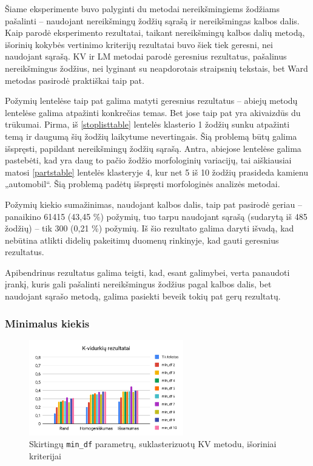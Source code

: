 \documentclass{VUMIFInfBakalaurinis}
\begin{document}
Šiame eksperimente buvo palyginti du metodai nereikšmingiems žodžiams
pašalinti -- naudojant nereikšmingų žodžių sąrašą ir nereikšmingas
kalbos dalis.
Kaip parodė eksperimento rezultatai, taikant nereikšmingų kalbos dalių metodą,
 išorinių kokybės vertinimo kriterijų rezultatai buvo šiek tiek geresni, nei naudojant sąrašą. 
KV ir LM
metodai parodė geresnius rezultatus, pašalinus nereikšmingus žodžius,
nei lyginant su neapdorotais straipsnių tekstais, bet Ward metodas
pasirodė praktiškai taip pat.

Požymių lentelėse taip pat galima matyti geresnius rezultatus -- abiejų
metodų lentelėse galima atpažinti konkrečias temas. Bet jose taip pat
yra akivaizdūs du trūkumai. Pirma, iš \ref{stoplisttable} lentelės klasterio 1 žodžių sunku atpažinti temą ir
daugumą šių žodžių laikytume nevertingais. Šią problemą būtų galima
išspręsti, papildant nereikšmingų žodžių sąrašą. Antra, abiejose
lentelėse galima pastebėti, kad yra daug to pačio žodžio morfologinių
variacijų, tai aiškiausiai matosi \ref{partstable}
lentelės klasteryje 4, kur net 5 iš 10 žodžių prasideda kamienu
„automobil“. Šią problemą padėtų išspręsti morfologinės analizės
metodai.

Požymių kiekio sumažinimas, naudojant kalbos dalis, taip pat pasirodė
geriau -- panaikino 61415 (43,45 \%) požymių, tuo tarpu naudojant
sąrašą (sudarytą iš 485 žodžių) -- tik 300 (0,21 \%) požymių. Iš šio
rezultato galima daryti išvadą, kad nebūtina atlikti didelių pakeitimų
duomenų rinkinyje, kad gauti geresnius rezultatus.

Apibendrinus rezultatus galima teigti, kad, esant galimybei, verta
panaudoti įrankį, kuris gali pašalinti nereikšmingus žodžius pagal
kalbos dalis, bet naudojant sąrašo metodą, galima pasiekti beveik tokių
pat gerų rezultatų.

\subsubsection{Minimalus kiekis}\label{mindftest}

\begin{figure}[H]
	\centering
	\includegraphics[width=0.6\textwidth]{./img/image11.png}
  \caption{Skirtingų \texttt{min\_df} parametrų, suklasterizuotų KV metodu, išoriniai
  kriterijai}
\end{figure}
\end{document}
